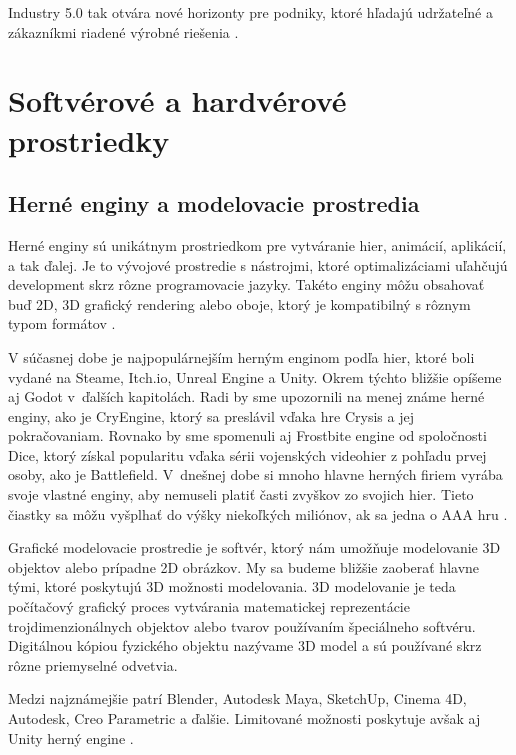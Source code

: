 Industry 5.0 tak otvára nové horizonty pre podniky, ktoré hľadajú udržateľné a zákazníkmi riadené výrobné riešenia \cite{kucera2024industry40}. 

\section{Softvérové a hardvérové prostriedky}

\subsection{Herné enginy a modelovacie prostredia}

Herné enginy sú unikátnym prostriedkom pre vytváranie hier, animácií, aplikácií, a tak ďalej. Je to vývojové prostredie s nástrojmi, ktoré optimalizáciami uľahčujú development skrz rôzne programovacie jazyky. Takéto enginy môžu obsahovať buď 2D, 3D grafický rendering alebo oboje, ktorý je kompatibilný s rôznym typom formátov \cite{arm_gaming_engines}.  %

V súčasnej dobe je najpopulárnejším herným enginom podľa hier, ktoré boli vydané na Steame, Itch.io, Unreal Engine a Unity. Okrem týchto bližšie opíšeme aj Godot v~ďalších kapitolách. Radi by sme upozornili na menej známe herné enginy, ako je CryEngine, ktorý sa preslávil vďaka hre Crysis a jej pokračovaniam. Rovnako by sme spomenuli aj Frostbite engine od spoločnosti Dice, ktorý získal popularitu vďaka sérii vojenských videohier z pohľadu prvej osoby, ako je Battlefield. V~dnešnej dobe si mnoho hlavne herných firiem vyrába svoje vlastné enginy, aby nemuseli platiť časti zvyškov zo svojich hier. Tieto čiastky sa môžu vyšplhať do výšky niekoľkých miliónov, ak sa jedna o AAA hru \cite{perforce2023gameengines}.  %

Grafické modelovacie prostredie je softvér, ktorý nám umožňuje modelovanie 3D objektov alebo prípadne 2D obrázkov. My sa budeme bližšie zaoberať hlavne tými, ktoré poskytujú 3D možnosti modelovania. 3D modelovanie je teda počítačový grafický proces vytvárania matematickej reprezentácie trojdimenzionálnych objektov alebo tvarov používaním špeciálneho softvéru. Digitálnou kópiou fyzického objektu nazývame 3D model a sú používané skrz rôzne priemyselné odvetvia. 

Medzi najznámejšie patrí Blender, Autodesk Maya, SketchUp, Cinema 4D, Autodesk, Creo Parametric a ďalšie. Limitované možnosti poskytuje avšak aj Unity herný engine \cite{autodesk2024modelingsoftware}. 

